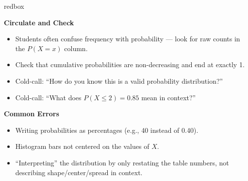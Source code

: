 \documentclass[10pt]{article}
\begin{document}
\begin{skillbox}{redbox}
\begin{minipage}[t]{0.48\linewidth}
    \textbf{Circulate and Check}
    \begin{itemize}
        \item Students often confuse frequency with probability --- look for raw counts in the
              $P(X=x)$ column.
        \item Check that cumulative probabilities are non-decreasing and end at exactly 1.
        \item Cold-call: ``How do you know this is a valid probability distribution?''
        \item Cold-call: ``What does $P(X \le 2) = 0.85$ mean in context?''
    \end{itemize}
\end{minipage}
\hfill
\begin{minipage}[t]{0.48\linewidth}
    \textbf{Common Errors}
    \begin{itemize}
        \item Writing probabilities as percentages (e.g., 40 instead of 0.40).
        \item Histogram bars not centered on the values of $X$.
        \item ``Interpreting'' the distribution by only restating the table numbers, not
              describing shape/center/spread in context.
    \end{itemize}
\end{minipage}
\end{skillbox}
\end{document}
